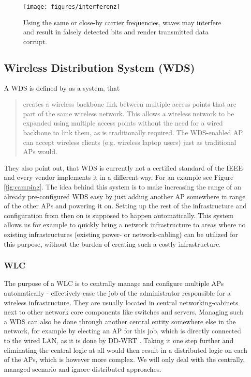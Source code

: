 	\begin{figure}[h!]
	  \centering
	  \texttt{[image: figures/interferenz]}
	  \caption{Using the same or close-by carrier frequencies, waves may interfere and result in falsely detected bits and render transmitted data corrupt.}
	  \label{fig:interferenz}
	\end{figure}
	
\newpage
	      
    \subsection{Wireless Distribution System (WDS)}
      A \ac{WDS} is defined by \cite{dd_wrt} as a system, that
      
      \begin{quote}
	creates a wireless backbone link between multiple access points that are part of the same wireless network. 
	This allows a wireless network to be expanded using multiple access points without the need for a wired backbone to link them, as is traditionally required. 
	The WDS-enabled \ac{AP} can accept wireless clients (e.g. wireless laptop users) just as traditional APs would.
      \end{quote}

      They also point out, that WDS is currently not a certified standard of the \ac{IEEE} and every vendor implements it in a different way.
      For an example see Figure \ref{fig:camping}. The idea behind this system is to make increasing the range of an already pre-configured \ac{WDS}
      easy by just adding another \ac{AP} somewhere in range of the other APs and powering it on.
      Setting up the rest of the infrastructure and configuration from then on is supposed to happen automatically. 
      This system allows us for example to quickly bring a network infrastructure to areas where no 
      existing infrastructures (existing power- or network-cabling) can be utilized for this purpose, without the burden of creating such a costly infrastructure.
      
      \subsubsection{\ac{WLC}}
	The purpose of a \ac{WLC} is to centrally manage and configure multiple APs automatically - effectively ease the job of the administrator responsible for a 
	wireless infrastructure. They are usually located in central networking-cabinets next to other network core components like switches and servers.
	Managing such a \ac{WDS} can also be done through another central entity somewhere else in the network, for example by
	electing an \ac{AP} for this job, which is directly connected to the wired \ac{LAN}, as it is done by DD-WRT \cite{dd_wrt}. 
	Taking it one step further and eliminating the central logic at all would then result in a distributed logic on each of the APs, which is however more complex. 
	We will only deal with the centrally, managed scenario and ignore distributed approaches.
	
